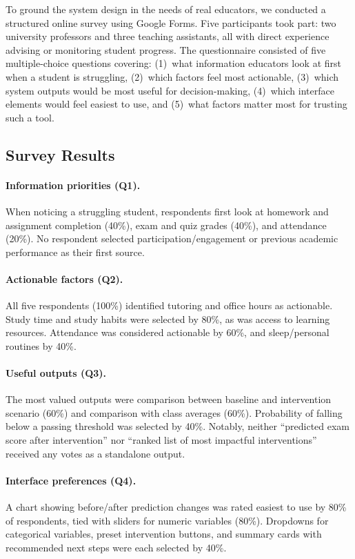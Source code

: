 \documentclass[11pt]{article}
\begin{document}
To ground the system design in the needs of real educators, we conducted a structured online survey using Google Forms. Five participants took part: two university professors and three teaching assistants, all with direct experience advising or monitoring student progress. The questionnaire consisted of five multiple-choice questions covering: (1)~what information educators look at first when a student is struggling, (2)~which factors feel most actionable, (3)~which system outputs would be most useful for decision-making, (4)~which interface elements would feel easiest to use, and (5)~what factors matter most for trusting such a tool.

\subsection{Survey Results}

\paragraph{Information priorities (Q1).} When noticing a struggling student, respondents first look at homework and assignment completion (40\%), exam and quiz grades (40\%), and attendance (20\%). No respondent selected participation/engagement or previous academic performance as their first source.

\paragraph{Actionable factors (Q2).} All five respondents (100\%) identified tutoring and office hours as actionable. Study time and study habits were selected by 80\%, as was access to learning resources. Attendance was considered actionable by 60\%, and sleep/personal routines by 40\%.

\paragraph{Useful outputs (Q3).} The most valued outputs were comparison between baseline and intervention scenario (60\%) and comparison with class averages (60\%). Probability of falling below a passing threshold was selected by 40\%. Notably, neither ``predicted exam score after intervention'' nor ``ranked list of most impactful interventions'' received any votes as a standalone output.

\paragraph{Interface preferences (Q4).} A chart showing before/after prediction changes was rated easiest to use by 80\% of respondents, tied with sliders for numeric variables (80\%). Dropdowns for categorical variables, preset intervention buttons, and summary cards with recommended next steps were each selected by 40\%.
\end{document}
